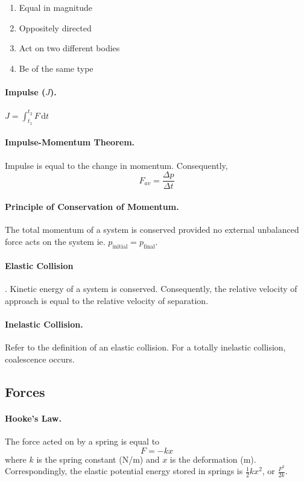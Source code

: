 \documentclass{article}
\begin{document}
\begin{enumerate} \item Equal in magnitude \item Oppositely directed \item Act
on two different bodies \item Be of the same type \end{enumerate}

\paragraph{Impulse ($J$).} $J = \int^{t_2}_{t_1} \! F \, \mathrm{d}{t}$

\paragraph{Impulse-Momentum Theorem.} Impulse is equal to the change in
momentum. Consequently, \begin{equation} F_{av} = \frac{\Delta p}{\Delta t}
\end{equation}

\paragraph{Principle of Conservation of Momentum.} The total momentum of a
system is conserved provided no external unbalanced force acts on the system ie.
$p_\text{initial} = p_\text{final}$.

\paragraph{Elastic Collision}. Kinetic energy of a system is conserved.
Consequently, the relative velocity of approach is equal to the relative
velocity of separation.

\paragraph{Inelastic Collision.} Refer to the definition of an elastic
collision. For a totally inelastic collision, coalescence occurs.

\subsection{Forces}

\paragraph{Hooke's Law.} The force acted on by a spring is equal to
\begin{equation} F = -kx \end{equation} where $k$ is the spring constant (N/m)
  and $x$ is the deformation (m). Correspondingly, the elastic potential energy
  stored in springs is $\frac{1}{2}kx^2$, or $\frac{F^2}{2k}$.
\end{document}

